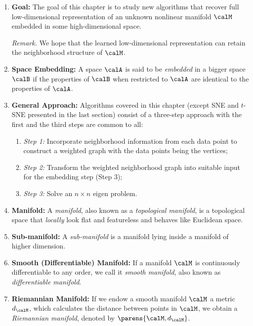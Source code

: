 \documentclass[12pt]{article}
\begin{document}
\begin{enumerate}[label=\textbf{\arabic*.}]

	\item \textbf{Goal:} The goal of this chapter is to study new algorithms that recover full low-dimensional representation of an unknown nonlinear manifold $\calM$ embedded in some high-dimensional space. 
	
	\textit{Remark.} We hope that the learned low-dimensional representation can retain the neighborhood structure of $\calM$. 
	
	\item \textbf{Space Embedding:} A space $\calA$ is said to be \emph{embedded} in a bigger space $\calB$ if the properties of $\calB$ when restricted to $\calA$ are identical to the properties of $\calA$. 
	
	\item \textbf{General Approach:} Algorithms covered in this chapter (except SNE and $t$-SNE presented in the last section) consist of a three-step approach with the first and the third steps are common to all: 
	\begin{enumerate}
		\item \textit{Step 1:} Incorporate neighborhood information from each data point to construct a weighted graph with the data points being the vertices; 
		\item \textit{Step 2:} Transform the weighted neighborhood graph into suitable input for the embedding step (Step 3); 
		\item \textit{Step 3:} Solve an $n \times n$ eigen problem. 
	\end{enumerate}
	
	\item \textbf{Manifold:} A \emph{manifold}, also known as a \textit{topological manifold}, is a topological space that \emph{locally} look flat and featureless and behaves like Euclidean space. 
	
	\item \textbf{Sub-manifold:} A \emph{sub-manifold} is a manifold lying inside a manifold of higher dimension. 
	
	\item \textbf{Smooth (Differentiable) Manifold:} If a manifold $\calM$ is continuously differentiable to any order, we call it \emph{smooth manifold}, also known as \emph{differentiable manifold}. 
	
	\item \textbf{Riemannian Manifold:} If we endow a smooth manifold $\calM$ a metric $d_{\calM}$, which calculates the distance between points in $\calM$, we obtain a \emph{Riemannian manifold}, denoted by $\parens{\calM, d_{\calM}}$. 
	

\end{enumerate}
\end{document}
